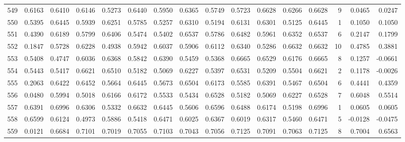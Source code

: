 \begin{tabular}{lrrrrrrrrrrrrrrr}
549 &      0.6163 &  0.6410 &  0.6146 &  0.5273 &  0.6440 &  0.5950 &  0.6365 &  0.5749 &  0.5723 &  0.6628 &   0.6266 &     0.6628 &      9 &                    0.0465 &                     0.0247 \\
550 &      0.5395 &  0.6445 &  0.5939 &  0.6251 &  0.5785 &  0.5257 &  0.6310 &  0.5194 &  0.6131 &  0.6301 &   0.5125 &     0.6445 &      1 &                    0.1050 &                     0.1050 \\
551 &      0.4390 &  0.6189 &  0.5799 &  0.6406 &  0.5474 &  0.5402 &  0.6537 &  0.5786 &  0.6482 &  0.5961 &   0.6352 &     0.6537 &      6 &                    0.2147 &                     0.1799 \\
552 &      0.1847 &  0.5728 &  0.6228 &  0.4938 &  0.5942 &  0.6037 &  0.5906 &  0.6112 &  0.6340 &  0.5286 &   0.6632 &     0.6632 &     10 &                    0.4785 &                     0.3881 \\
553 &      0.5408 &  0.4747 &  0.6036 &  0.6368 &  0.5842 &  0.6390 &  0.5459 &  0.5368 &  0.6665 &  0.6529 &   0.6176 &     0.6665 &      8 &                    0.1257 &                    -0.0661 \\
554 &      0.5443 &  0.5417 &  0.6621 &  0.6510 &  0.5182 &  0.5069 &  0.6227 &  0.5397 &  0.6531 &  0.5209 &   0.5504 &     0.6621 &      2 &                    0.1178 &                    -0.0026 \\
555 &      0.2063 &  0.6422 &  0.6452 &  0.5664 &  0.6445 &  0.5673 &  0.6504 &  0.6173 &  0.5585 &  0.6391 &   0.5467 &     0.6504 &      6 &                    0.4441 &                     0.4359 \\
556 &      0.0480 &  0.5994 &  0.5018 &  0.6166 &  0.6172 &  0.5533 &  0.5434 &  0.6528 &  0.5182 &  0.5069 &   0.6227 &     0.6528 &      7 &                    0.6048 &                     0.5514 \\
557 &      0.6391 &  0.6996 &  0.6306 &  0.5332 &  0.6632 &  0.6445 &  0.5606 &  0.6596 &  0.6488 &  0.6174 &   0.5198 &     0.6996 &      1 &                    0.0605 &                     0.0605 \\
558 &      0.6599 &  0.6124 &  0.4973 &  0.5886 &  0.5418 &  0.6471 &  0.6025 &  0.6367 &  0.6019 &  0.6317 &   0.5460 &     0.6471 &      5 &                   -0.0128 &                    -0.0475 \\
559 &      0.0121 &  0.6684 &  0.7101 &  0.7019 &  0.7055 &  0.7103 &  0.7043 &  0.7056 &  0.7125 &  0.7091 &   0.7063 &     0.7125 &      8 &                    0.7004 &                     0.6563 \\

\end{tabular}
